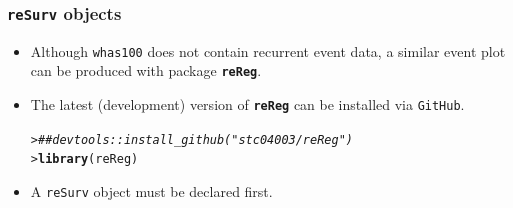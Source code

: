 \documentclass[10pt]{beamer}\usepackage[]{graphicx}\usepackage[]{color}
\makeatletter
\newcommand{\hlcom}[1]{\textcolor[rgb]{0.678,0.584,0.686}{\textit{#1}}}%
\newcommand{\hlstd}[1]{\textcolor[rgb]{0.345,0.345,0.345}{#1}}%
\newcommand{\hlkwd}[1]{\textcolor[rgb]{0.737,0.353,0.396}{\textbf{#1}}}%
\newenvironment{kframe}{%
 \def\at@end@of@kframe{}%
 \ifinner\ifhmode%
  \def\at@end@of@kframe{\end{minipage}}%
  \begin{minipage}{\columnwidth}%
 \fi\fi%
 \def\FrameCommand##1{\hskip\@totalleftmargin \hskip-\fboxsep
 \colorbox{shadecolor}{##1}\hskip-\fboxsep
     \hskip-\linewidth \hskip-\@totalleftmargin \hskip\columnwidth}%
 \MakeFramed {\advance\hsize-\width
   \@totalleftmargin\z@ \linewidth\hsize
   \@setminipage}}%
 {\par\unskip\endMakeFramed%
 \at@end@of@kframe}
\newenvironment{knitrout}{}{} %
\renewenvironment{knitrout}{\setlength{\topsep}{-.2mm}}{}
\newcommand{\pkg}[1]{{\textbf{\texttt{#1}}}}
\newcommand{\code}[1]{{\texttt{#1}}}
\makeatother
\begin{document}
\begin{frame}[fragile]
  \frametitle{\texttt{reSurv} objects}
  \begin{itemize}
  \item Although \code{whas100} does not contain recurrent event data, 
    a similar event plot can be produced with package \pkg{reReg}.
  \item The latest (development) version of \pkg{reReg} can be installed via \texttt{GitHub}.
\begin{knitrout}\scriptsize
{}\color{fgcolor}\begin{kframe}
\begin{alltt}
\hlstd{> }\hlcom{## devtools::install_github("stc04003/reReg")}
\hlstd{> }\hlkwd{library}\hlstd{(reReg)}
\end{alltt}
\end{kframe}
\end{knitrout}
  \item A \code{reSurv} object must be declared first.
  \end{itemize}
\end{frame}
\end{document}
